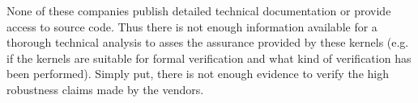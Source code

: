 None of these companies publish detailed technical documentation or provide
access to source code. Thus there is not enough information available for a
thorough technical analysis to asses the assurance provided by these kernels
(e.g. if the kernels are suitable for formal verification and what kind of
verification has been performed). Simply put, there is not enough evidence to
verify the high robustness claims made by the vendors.
